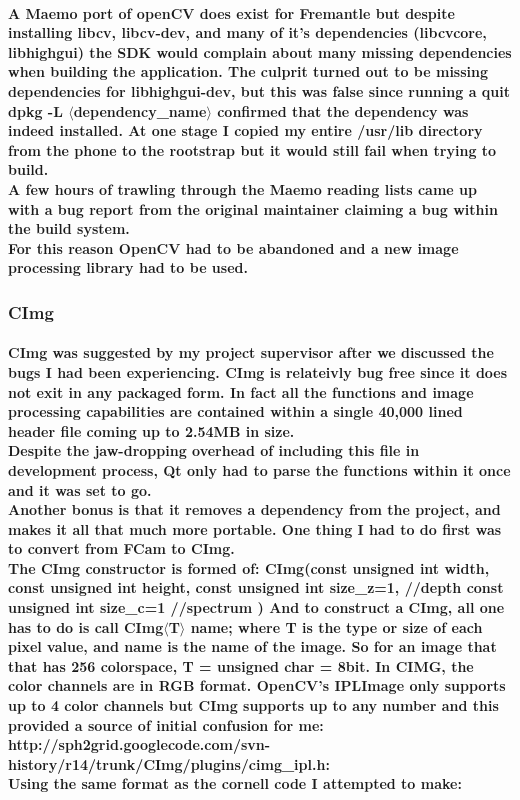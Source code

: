 \documentclass[11pt]{article} %
\begin{document}
\paragraph{
A Maemo port of openCV does exist for Fremantle \cite{libcv} but despite installing libcv, libcv-dev, and many of it's dependencies (libcvcore, libhighgui) the SDK would complain about many missing dependencies when building the application. The culprit turned out to be missing dependencies for libhighgui-dev, but this was false since running a quit dpkg -L \(\langle\)dependency\_name\(\rangle\) confirmed that the dependency was indeed installed. At one stage I copied my entire /usr/lib directory from the phone to the rootstrap but it would still fail when trying to build.\\
A few hours of trawling through the Maemo reading lists came up with a bug report \cite{highgui-dev} from the original maintainer claiming a bug within the build system.\\
For this reason OpenCV had to be abandoned and a new image processing library had to be used.
}
\subsubsection{CImg}
\paragraph{CImg was suggested by my project supervisor after we discussed the bugs I had been experiencing. CImg is relateivly bug free since it does not exit in any packaged form. In fact all the functions and image processing capabilities are contained within a single 40,000 lined header file coming up to 2.54MB in size. \\Despite the jaw-dropping overhead of including this file in development process, Qt only had to parse the functions within it once and it was set to go.\\
Another bonus is that it removes a dependency from the project, and makes it all that much more portable. One thing I had to do first was to convert from FCam to CImg.
\\The CImg constructor is formed of: 
CImg(const unsigned int width,
     const unsigned int height,
     const unsigned int size\_z=1, //depth
     const unsigned int size\_c=1 //spectrum
)
And to construct a CImg, all one has to do is call CImg\(\langle\)T\(\rangle\) name; where T is the type or size of each pixel value, and name is the name of the image. So for an image that that has 256 colorspace, T = unsigned char = 8bit.
In CIMG, the color channels are in RGB format. OpenCV's IPLImage only supports up to 4 color channels but CImg supports up to any number and this provided a source of initial confusion for me:
http://sph2grid.googlecode.com/svn-history/r14/trunk/CImg/plugins/cimg\_ipl.h:\\
Using the same format as the cornell code I attempted to make:}
\begin{frame}[fragile]

\end{frame}
\end{document}
